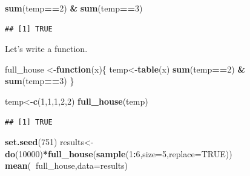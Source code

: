 \documentclass[
]{book}
\newenvironment{Shaded}{\begin{snugshade}}{\end{snugshade}}
\newcommand{\ControlFlowTok}[1]{\textcolor[rgb]{0.13,0.29,0.53}{\textbf{#1}}}
\newcommand{\DataTypeTok}[1]{\textcolor[rgb]{0.13,0.29,0.53}{#1}}
\newcommand{\DecValTok}[1]{\textcolor[rgb]{0.00,0.00,0.81}{#1}}
\newcommand{\KeywordTok}[1]{\textcolor[rgb]{0.13,0.29,0.53}{\textbf{#1}}}
\newcommand{\NormalTok}[1]{#1}
\newcommand{\OperatorTok}[1]{\textcolor[rgb]{0.81,0.36,0.00}{\textbf{#1}}}
\newcommand{\OtherTok}[1]{\textcolor[rgb]{0.56,0.35,0.01}{#1}}
\newcommand{\StringTok}[1]{\textcolor[rgb]{0.31,0.60,0.02}{#1}}
\begin{document}
\begin{Shaded}
\begin{Highlighting}[]
\KeywordTok{sum}\NormalTok{(temp}\OperatorTok{==}\DecValTok{2}\NormalTok{) }\OperatorTok{&}\StringTok{ }\KeywordTok{sum}\NormalTok{(temp}\OperatorTok{==}\DecValTok{3}\NormalTok{)}
\end{Highlighting}
\end{Shaded}

\begin{verbatim}
## [1] TRUE
\end{verbatim}

Let's write a function.

\begin{Shaded}
\begin{Highlighting}[]
\NormalTok{full_house <-}\ControlFlowTok{function}\NormalTok{(x)\{}
\NormalTok{  temp<-}\KeywordTok{table}\NormalTok{(x)}
  \KeywordTok{sum}\NormalTok{(temp}\OperatorTok{==}\DecValTok{2}\NormalTok{) }\OperatorTok{&}\StringTok{ }\KeywordTok{sum}\NormalTok{(temp}\OperatorTok{==}\DecValTok{3}\NormalTok{)}
\NormalTok{\}}
\end{Highlighting}
\end{Shaded}

\begin{Shaded}
\begin{Highlighting}[]
\NormalTok{temp<-}\KeywordTok{c}\NormalTok{(}\DecValTok{1}\NormalTok{,}\DecValTok{1}\NormalTok{,}\DecValTok{1}\NormalTok{,}\DecValTok{2}\NormalTok{,}\DecValTok{2}\NormalTok{)}
\KeywordTok{full_house}\NormalTok{(temp)}
\end{Highlighting}
\end{Shaded}

\begin{verbatim}
## [1] TRUE
\end{verbatim}

\begin{Shaded}
\begin{Highlighting}[]
\KeywordTok{set.seed}\NormalTok{(}\DecValTok{751}\NormalTok{)}
\NormalTok{results<-}\KeywordTok{do}\NormalTok{(}\DecValTok{10000}\NormalTok{)}\OperatorTok{*}\KeywordTok{full_house}\NormalTok{(}\KeywordTok{sample}\NormalTok{(}\DecValTok{1}\OperatorTok{:}\DecValTok{6}\NormalTok{,}\DataTypeTok{size=}\DecValTok{5}\NormalTok{,}\DataTypeTok{replace=}\OtherTok{TRUE}\NormalTok{))}
\KeywordTok{mean}\NormalTok{(}\OperatorTok{~}\NormalTok{full_house,}\DataTypeTok{data=}\NormalTok{results)}
\end{Highlighting}
\end{Shaded}
\end{document}
